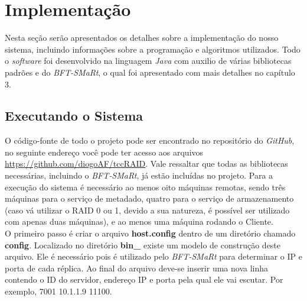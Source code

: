 





\section{Implementação}
Nesta seção serão apresentados os detalhes sobre a implementação do nosso sistema, incluindo informações sobre a programação e algoritmos utilizados. Todo o \textit{software} foi desenvolvido na linguagem \textit{Java} com auxilio de várias bibliotecas padrões e do \textit{BFT-SMaRt}, o qual foi apresentado com mais detalhes no capítulo 3. 
\\

\subsection{Executando o Sistema}
O código-fonte de todo o projeto pode ser encontrado no repositório do \textit{GitHub}, no seguinte endereço você pode ter acesso aos arquivos \href{https://github.com/diogoAF/tccRAID}{https://github.com/diogoAF/tccRAID}. Vale ressaltar que todas as bibliotecas necessárias, incluindo o  \textit{BFT-SMaRt}, já estão incluídas no projeto. Para a execução do sistema é necessário ao menos oito máquinas remotas, sendo três máquinas para o serviço de metadado, quatro para o serviço de armazenamento (caso vá utilizar o RAID 0 ou 1, devido a sua natureza, é possível ser utilizado com apenas duas máquinas), e ao menos uma máquina rodando o Cliente.
\\

O primeiro passo é criar o arquivo \textbf{host.config} dentro de um diretório chamado \textbf{config}. Localizado no diretório \textbf{bin\_ } existe um modelo de construção deste arquivo. Ele é necessário pois é utilizado pelo \textit{BFT-SMaRt} para determinar o IP e porta de cada réplica. Ao final do arquivo deve-se inserir uma nova linha contendo o ID do servidor, endereço IP e porta pela qual ele vai escutar. Por exemplo, 7001 10.1.1.9 11100.
\\

